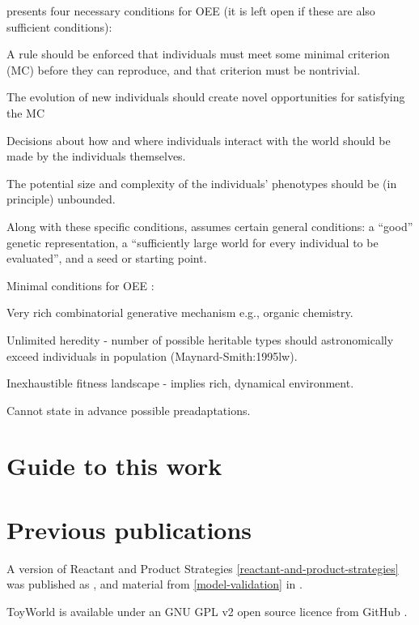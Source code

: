 \parencite{Soros2014} presents four necessary conditions for OEE (it is left open if these are also sufficient conditions):
\begin{compactenum}
	\item A rule should be enforced that individuals must meet some minimal criterion (MC) before they can reproduce, and that criterion must be nontrivial.
	\item The evolution of new individuals should create novel opportunities for satisfying the MC
	\item Decisions about how and where individuals interact with the world should be made by the individuals themselves.
	\item The potential size and complexity of the individuals' phenotypes should be (in principle) unbounded.
\end{compactenum}
Along with these specific conditions, \parencite{Soros2014} assumes certain general conditions: a ``good'' genetic representation, a ``sufficiently large world for every individual to be evaluated'', and a seed or starting point.

Minimal conditions for OEE \parencite{Vasas2015}:
\begin{compactenum}
	\item Very rich combinatorial generative mechanism e.g., organic chemistry.
	\item Unlimited heredity - number of possible heritable types should astronomically exceed individuals in population (Maynard-Smith:1995lw).
	\item Inexhaustible fitness landscape - implies rich, dynamical environment.
	\item Cannot state in advance possible preadaptations.
\end{compactenum}

\section{Guide to this work}

\section{Previous publications}\label{previous-publications}

A version of Reactant and Product Strategies \cref{reactant-and-product-strategies} was published as \cite{Young2015},
and material from \cref{model-validation} in \cite{Young2013}.

ToyWorld is available under an GNU GPL v2 open source licence from GitHub \cite{toyworld}.

